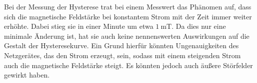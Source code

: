 Bei der Messung der Hysterese trat bei einem Messwert das Phänomen auf, dass sich
die magnetische Feldstärke bei konstantem Strom mit der Zeit immer weiter erhöhte.
Dabei stieg sie in einer Minute um etwa $\SI{1}{\milli\tesla}$. Da dies nur eine minimale Änderung
ist, hat sie auch keine nennenswerten Auswirkungen auf die Gestalt der Hysteresekurve.
Ein Grund hierfür könnten Ungenauigkeiten des Netzgerätes, das den Strom erzeugt, sein,
sodass mit einem steigenden Strom auch die magnetische Feldstärke steigt. Es
könnten jedoch auch äußere Störfelder gewirkt haben.
